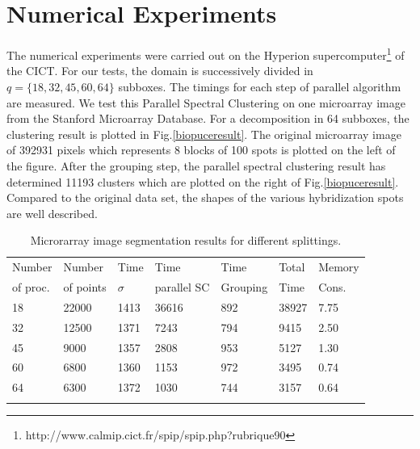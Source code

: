 \documentclass[]{svmult}
\begin{document}

\vspace{-0.7cm}
\section{Numerical Experiments} \label{numerical}
\vspace{-0.3cm}

The numerical experiments were carried out on the Hyperion
supercomputer\footnote{http://www.calmip.cict.fr/spip/spip.php?rubrique90} of the CICT.
For our tests, the domain is successively divided in $q=\{18,32,45,60,64\}$
subboxes.
The timings for each step of parallel algorithm are measured. We test this
Parallel Spectral Clustering on one microarray image from the Stanford
Microarray Database.
For a decomposition in 64 subboxes, the clustering result is plotted in
Fig.\ref{biopuceresult}. The original microarray image of 392931 pixels which
represents 8 blocks of 100 spots is plotted on the left of the figure.
After the grouping step, the parallel spectral clustering result has
determined 11193 clusters which are plotted on the right of
Fig.\ref{biopuceresult}.
Compared to the original data set, the shapes of the various hybridization
spots are well described.
\vspace{-0.3cm}
\begin{table}
\caption{Microrarray image segmentation results for different splittings.} \label{biopuce_res}
\begin{center}
\begin{tabular}{p{1.5cm}p{1.5cm}p{1.5cm}p{1.7cm}p{1.5cm}p{1.5cm}p{1.7cm}}
\hline\noalign{\smallskip}
Number & Number & Time & Time & Time & Total & Memory \\
of proc. & of points & $\sigma$ & parallel SC & Grouping & Time & Cons.\\
\noalign{\smallskip}\svhline\noalign{\smallskip}
18 & 22000 & 1413 & 36616 & 892 & 38927 & 7.75\\
32 & 12500 & 1371 & 7243  & 794 & 9415  & 2.50\\
45  & 9000  & 1357 & 2808  & 953 & 5127 & 1.30\\
60  & 6800  & 1360 & 1153  & 972 & 3495 & 0.74\\
64 & 6300  & 1372 & 1030  & 744 & 3157  & 0.64\\
\noalign{\smallskip}\hline\noalign{\smallskip}
\end{tabular}
\end{center}
\end{table}
\vspace{-0.3cm}
\end{document}
